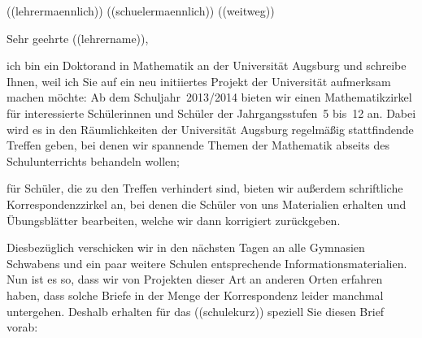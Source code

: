 \documentclass{../../zirkelbrief}
\begin{document}
\renewcommand{\anschrift}{%
      ((schule)) \\
      ((lehrername)) \\
      ((strasse)) \\
      ((plz)) ((ort))}
\renewcommand{\datum}{\today}
\renewcommand{\betreff}{Matheschülerzirkel der Universität Augsburg}
\renewcommand{\absender}{%
      \textbf{Ingo Blechschmidt} \\
      \ \\
      Lehrstuhl für Algebra und Zahlentheorie \\
      Universitätsstr. 14 \\
      86159 Augsburg \\
      \ \\
      Telefon \> +49 (0) 821 598 -- 5601 \\
      Telefax \> +49 (0) 821 598 -- 2090 \\
      \textsf{blechschmidt@math.uni-augsburg.de} \\}

\makeletterhead

\newif\iflehrermaennlich\lehrermaennlich((lehrermaennlich))
\newif\ifschuelermaennlich\schuelermaennlich((schuelermaennlich))
\newif\ifweitweg\weitweg((weitweg))

\iflehrermaennlich
Sehr geehrter ((lehrername)),
\else
Sehr geehrte ((lehrername)),
\fi

ich bin ein Doktorand in Mathematik an der Universität Augsburg und schreibe
Ihnen, weil ich Sie auf ein neu initiiertes Projekt der Universität aufmerksam machen
möchte: Ab dem Schuljahr~2013/2014 bieten wir einen Mathematikzirkel für
interessierte Schülerinnen und Schüler der Jahrgangsstufen~5 bis~12 an. Dabei
wird es in den Räumlichkeiten der Universität Augsburg regelmäßig stattfindende
Treffen geben, bei denen wir spannende Themen der Mathematik abseits des
Schulunterrichts behandeln wollen;
\ifweitweg
da ((ort)) ja recht weit von Augsburg entfernt liegt, bieten wir außerdem
schriftliche Korrespondenzzirkel an, bei denen die Schüler von uns Materialien
erhalten und Übungsblätter bearbeiten, welche wir dann korrigiert zurückgeben.
\else
für Schüler, die zu den Treffen verhindert sind, bieten wir außerdem
schriftliche Korrespondenzzirkel an, bei denen die Schüler von uns Materialien
erhalten und Übungsblätter bearbeiten, welche wir dann korrigiert zurückgeben.
\fi

Diesbezüglich verschicken wir in den nächsten Tagen an alle Gymnasien Schwabens
und ein paar weitere Schulen entsprechende Informationsmaterialien. Nun ist es
so, dass wir von Projekten dieser Art an anderen Orten erfahren haben, dass
solche Briefe in der Menge der Korrespondenz leider manchmal untergehen.
Deshalb erhalten für das ((schulekurz)) speziell Sie diesen Brief vorab:
\end{document}
